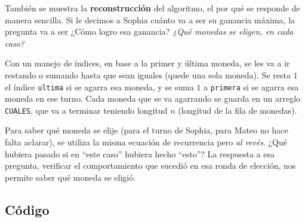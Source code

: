 También se muestra la \textbf{reconstrucción} del algoritmo, el por qué se responde de manera sencilla. Si le decimos a Sophia cuánto va a ser su ganancia máxima, la pregunta va a ser ¿Cómo logro esa ganancia? \textit{¿Qué monedas se eligen, en cada caso?}

Con un manejo de índices, en base a la primer y última moneda, se les va a ir restando o sumando hasta que sean iguales (quede una sola moneda). Se resta $1$ el índice \texttt{ultima} si se agarra esa moneda, y se suma $1$ a \texttt{primera} si se agarra esa moneda en ese turno.
Cada moneda que se va agarrando se guarda en un arreglo \texttt{CUALES}, que va a terminar teniendo longitud $n$ (longitud de la fila de monedas). 

Para saber qué moneda se elije (para el turno de Sophia, para Mateo no hace falta aclarar), se utiliza la misma ecuación de recurrencia pero \textit{al revés}. ¿Qué hubiera pasado si en ``este caso'' hubiera hecho ``esto''? La respuesta a esa pregunta, verificar el comportamiento que sucedió en esa ronda de elección, nos permite saber qué moneda se eligió. \\

\subsection{Código}\label{rec:codigo} %

